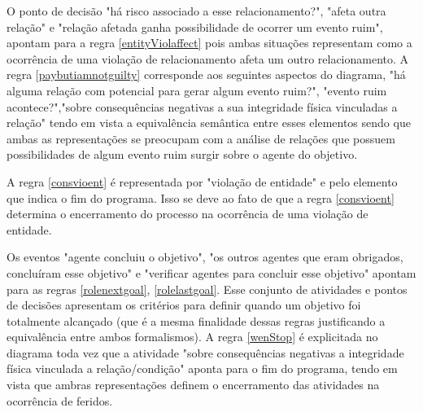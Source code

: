 O ponto de decisão "há risco associado a esse relacionamento?", "afeta  outra relação" e "relação afetada ganha possibilidade de ocorrer um evento ruim", apontam para a regra \ref{entityViolaffect} pois ambas situações representam como a ocorrência de uma violação de relacionamento afeta um outro relacionamento. A regra \ref{paybutiamnotguilty} corresponde aos seguintes aspectos do diagrama, "há alguma relação com potencial para gerar algum evento ruim?", "evento ruim acontece?","sobre consequências negativas a sua integridade física vinculadas a relação" tendo em vista a equivalência semântica entre esses elementos sendo que ambas as representações se preocupam com a análise de relações que possuem possibilidades de algum evento ruim surgir sobre o agente do objetivo. 

A regra \ref{consvioent} é representada por "violação de entidade" e pelo elemento que indica o fim do programa. Isso se deve ao fato de que a regra \ref{consvioent} determina o encerramento do processo na ocorrência de uma violação de entidade. 

Os eventos "agente concluiu o objetivo", "os outros agentes que eram obrigados, concluíram esse objetivo" e "verificar agentes para concluir esse objetivo" apontam para as regras \ref{rolenextgoal}, \ref{rolelastgoal}. Esse conjunto de atividades e pontos de decisões apresentam os critérios para definir quando um objetivo foi totalmente alcançado (que é a mesma finalidade dessas regras justificando a equivalência entre ambos formalismos).  A regra \ref{wenStop} é explicitada no diagrama toda vez que a atividade "sobre consequências negativas a integridade física vinculada  a relação/condição" aponta para o fim do programa, tendo em vista que ambras representações definem o encerramento das atividades na ocorrência de feridos. 

